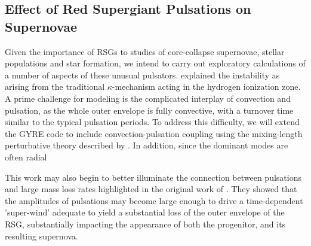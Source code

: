 \subsection{Effect of Red Supergiant Pulsations on Supernovae}

Given the importance of RSGs to studies of core-collapse supernovae, stellar populations and star formation, we intend to carry out exploratory calculations of a number of aspects of these unusual pulsators. 
\citet{1997AampA...327..224H}  explained the instability  as arising from the traditional $\kappa$-mechanism acting in the hydrogen ionization zone. A prime challenge for  modeling is the complicated interplay of convection and pulsation, as the whole outer envelope is fully convective, with a turnover time similar to the typical pulsation periods.   To address this difficulty, we will extend the GYRE code to include convection-pulsation coupling using the mixing-length perturbative theory described by \citet{Grigahcene:2005}. 
In addition, since the dominant modes are often radial

This work may also begin to better illuminate the connection between pulsations and large mass loss rates highlighted in the original work of \citet{Yoon_2010}. They showed that the amplitudes of pulsations may become large enough to drive a time-dependent 'super-wind' adequate to yield a substantial loss of the outer envelope of the RSG, substantially impacting the appearance of both the progenitor, and its resulting supernova.


